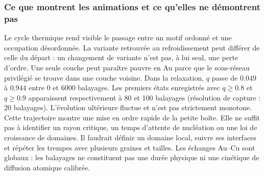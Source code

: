 \subsubsection{Ce que montrent les animations et ce qu’elles ne démontrent pas}
Le cycle thermique rend visible le passage entre un motif ordonné et une occupation désordonnée. La variante retrouvée au refroidissement peut différer de celle du départ : un changement de variante n'est pas, à lui seul, une perte d'ordre. Une seule couche peut paraître pauvre en Au parce que le sous-réseau privilégié se trouve dans une couche voisine.
Dans la relaxation, $q$ passe de $0.049$ à $0.944$ entre 0 et 6000 balayages. Les premiers états enregistrés avec $q\geq0.8$ et $q\geq0.9$ apparaissent respectivement à 80 et 100 balayages (résolution de capture : 20 balayages). L'évolution ultérieure fluctue et n'est pas strictement monotone.
Cette trajectoire montre une mise en ordre rapide de la petite boîte. Elle ne suffit pas à identifier un rayon critique, un temps d'attente de nucléation ou une loi de croissance de domaines. Il faudrait définir un domaine local, suivre ses interfaces et répéter les trempes avec plusieurs graines et tailles. Les échanges Au--Cu sont globaux : les balayages ne constituent pas une durée physique ni une cinétique de diffusion atomique calibrée.
